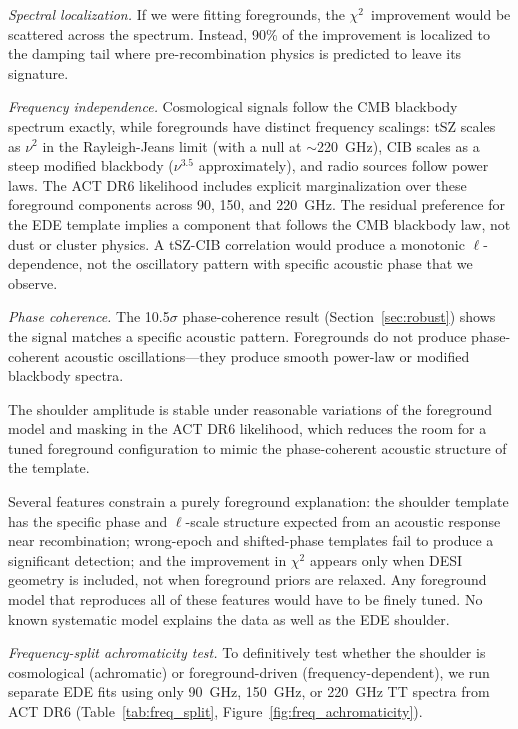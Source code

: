 \documentclass[twocolumn,showpacs,preprintnumbers,amsmath,amssymb,prd]{revtex4-2}
\newcommand{\chisq}{$\chi^2$}
\begin{document}
\emph{Spectral localization.} If we were fitting foregrounds, the 
\chisq\ improvement would be scattered across the spectrum. Instead, 
90\% of the improvement is localized to the damping tail where 
pre-recombination physics is predicted to leave its signature.

\emph{Frequency independence.} Cosmological signals follow the CMB blackbody 
spectrum exactly, while foregrounds have distinct frequency scalings: tSZ 
scales as $\nu^2$ in the Rayleigh-Jeans limit (with a null at $\sim$220~GHz), 
CIB scales as a steep modified blackbody ($\nu^{3.5}$ approximately), and 
radio sources follow power laws. The ACT DR6 likelihood includes explicit 
marginalization over these foreground components across 90, 150, and 220~GHz. 
The residual preference for the EDE template implies a component that follows 
the CMB blackbody law, not dust or cluster physics. A tSZ-CIB correlation 
would produce a monotonic $\ell$-dependence, not the oscillatory pattern 
with specific acoustic phase that we observe.

\emph{Phase coherence.} The 10.5$\sigma$ phase-coherence result 
(Section~\ref{sec:robust}) shows the signal matches a specific acoustic 
pattern. Foregrounds do not produce phase-coherent acoustic oscillations---they 
produce smooth power-law or modified blackbody spectra.

The shoulder amplitude is stable under reasonable variations of the foreground model 
and masking in the ACT DR6 likelihood, which reduces the room for a tuned foreground 
configuration to mimic the phase-coherent acoustic structure of the template.

Several features constrain a purely foreground 
explanation: the shoulder template has the specific phase and $\ell$-scale structure 
expected from an acoustic response near recombination; wrong-epoch and shifted-phase 
templates fail to produce a significant detection; and the improvement in $\chi^2$ 
appears only when DESI geometry is included, not when foreground priors are relaxed. 
Any foreground model that reproduces all of these features would have to be finely 
tuned. No known systematic model explains the data as well as the EDE shoulder.

\emph{Frequency-split achromaticity test.} To definitively test whether the shoulder
is cosmological (achromatic) or foreground-driven (frequency-dependent), we run 
separate EDE fits using only 90~GHz, 150~GHz, or 220~GHz TT spectra from ACT DR6
(Table~\ref{tab:freq_split}, Figure~\ref{fig:freq_achromaticity}).
\end{document}
